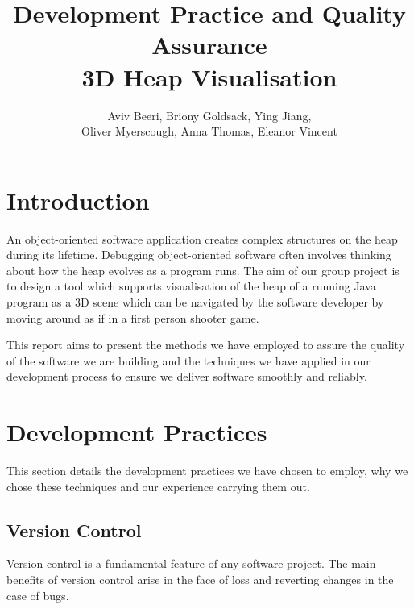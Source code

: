 \documentclass[10pt, a4paper]{article}
\begin{document}
\title{Development Practice and Quality Assurance
\\ 3D Heap Visualisation}
\author{Aviv Beeri, Briony Goldsack, Ying Jiang, 
\\ Oliver Myerscough, Anna Thomas, Eleanor Vincent}
\maketitle

\section{Introduction}

An object-oriented software application creates complex structures on the heap during its lifetime. Debugging object-oriented software often involves thinking about how the heap evolves as a program runs. The aim of our group project is to design a tool which supports visualisation of the heap of a running Java program as a 3D scene which can be navigated by the software developer by moving around as if in a first person shooter game.

This report aims to present the methods we have employed to assure the quality of the software we are building and the techniques we have applied in our development process to ensure we deliver software smoothly and reliably. 

\section{Development Practices}

This section details the development practices we have chosen to employ, why we chose these techniques and our experience carrying them out. 

\subsection{Version Control}

Version control is a fundamental feature of any software project. The main benefits of version  control arise in the face of loss and reverting changes in the case of bugs.
\end{document}
